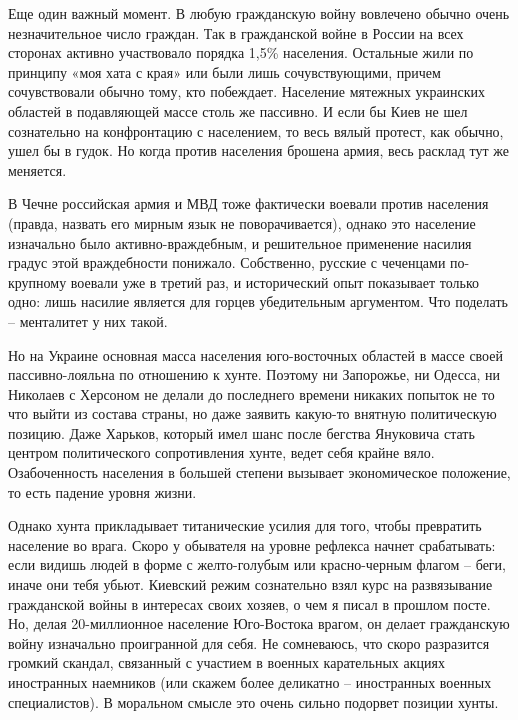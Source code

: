 Еще один важный момент. В любую гражданскую войну вовлечено обычно очень
незначительное число граждан. Так в гражданской войне в России на всех сторонах
активно участвовало порядка 1,5\% населения.  Остальные жили по принципу «моя
хата с края» или были лишь сочувствующими, причем сочувствовали обычно тому,
кто побеждает.  Население мятежных украинских областей в подавляющей массе
столь же пассивно. И если бы Киев не шел сознательно на конфронтацию с
населением, то весь вялый протест, как обычно, ушел бы в гудок. Но когда против
населения брошена армия, весь расклад тут же меняется.

В Чечне российская армия и МВД тоже фактически воевали против населения
(правда, назвать его мирным язык не поворачивается), однако это население
изначально было активно-враждебным, и решительное применение насилия градус
этой враждебности понижало. Собственно, русские с чеченцами по-крупному воевали
уже в третий раз, и исторический опыт показывает только одно: лишь насилие
является для горцев убедительным аргументом. Что поделать – менталитет у них
такой.

Но на Украине основная масса населения юго-восточных областей в массе своей
пассивно-лояльна по отношению к хунте.  Поэтому ни Запорожье, ни Одесса, ни
Николаев с Херсоном не делали до последнего времени никаких попыток не то что
выйти из состава страны, но даже заявить какую-то внятную политическую позицию.
Даже Харьков, который имел шанс после бегства Януковича стать центром
политического сопротивления хунте, ведет себя крайне вяло. Озабоченность
населения в большей степени вызывает экономическое положение, то есть падение
уровня жизни.

Однако хунта прикладывает титанические усилия для того, чтобы превратить
население во врага. Скоро у обывателя на уровне рефлекса начнет срабатывать:
если видишь людей в форме с желто-голубым или красно-черным флагом – беги,
иначе они тебя убьют.  Киевский режим сознательно взял курс на развязывание
гражданской войны в интересах своих хозяев, о чем я писал в прошлом посте. Но,
делая 20-миллионное население Юго-Востока  врагом, он делает гражданскую войну
изначально проигранной для себя. Не сомневаюсь, что скоро разразится громкий
скандал, связанный с участием в военных карательных акциях иностранных
наемников (или скажем более деликатно – иностранных военных специалистов). В
моральном смысле это очень сильно подорвет позиции хунты.

